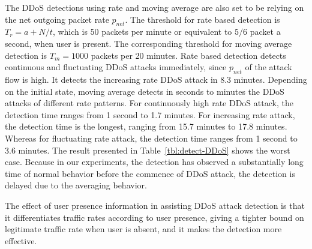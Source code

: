 The DDoS detections using rate and moving average are also set to be relying on the net outgoing packet rate $p_{net}$. The threshold for rate based detection is $T_r = a + N/t$, which is 50 packets per minute or equivalent to $5/6$ packet a second, when user is present. The corresponding threshold for moving average detection is $T_m = 1000$ packets per 20 minutes.
Rate based detection detects continuous and fluctuating DDoS attacks immediately, since $p_{net}$ of the attack flow is high. It detects the increasing rate DDoS attack in 8.3 minutes. 
Depending on the initial state, moving average detects in seconds to minutes the DDoS attacks of different rate patterns. For continuously high rate DDoS attack, the detection time ranges from 1 second to 1.7 minutes. For increasing rate attack, the detection time is the longest, ranging from 15.7 minutes to 17.8 minutes. Whereas for fluctuating rate attack, the detection time ranges from 1 second to 3.6 minutes. The result presented in Table~\ref{tbl:detect-DDoS} shows the worst case. Because in our experiments, the detection has observed a substantially long time of normal behavior before the commence of DDoS attack, the detection is delayed due to the averaging behavior.


The effect of user presence information in assisting DDoS attack detection is that it differentiates traffic rates according to user presence, giving a tighter bound on legitimate traffic rate when user is absent, and it makes the detection more effective. 

